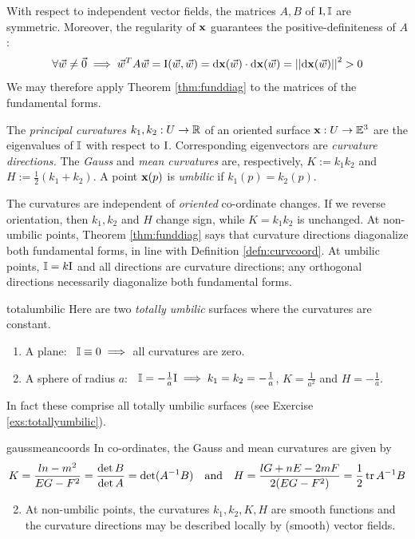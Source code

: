 {}

With respect to independent vector fields, the matrices $A,B$ of $\mathrm{I},\mathbb{I}$ are symmetric. Moreover, the regularity of ${\mathbf{x}}$ guarantees the positive-definiteness of $A$:
\[
	\forall \vec w\neq\vec 0\implies \vec w^TA\vec w=\mathrm{I}(\vec w,\vec w)=\mathrm{d}{\mathbf{x}}(\vec w)\cdot\mathrm{d}{\mathbf{x}}(\vec w)=\left| \left| \mathrm{d}{\mathbf{x}}(\vec w)\right|\right|^2>0
\]
We may therefore apply Theorem \ref{thm:funddiag} to the matrices of the fundamental forms.

\begin{defn}{}{}
	The \emph{principal curvatures} $k_1,k_2:U\to\mathbb{R}$ of an oriented surface ${\mathbf{x}}:U\to\mathbb{E}^3$ are the eigenvalues of $\mathbb{I}$ with respect to $\mathrm{I}$. Corresponding eigenvectors	are \emph{curvature directions.}
	\smallbreak
	The \emph{Gauss} and \emph{mean curvatures} are, respectively, $K:=k_1k_2$ and $H:=\frac 12(k_1+k_2)$.
	\smallbreak
	A point ${\mathbf{x}}(p)$ is \emph{umbilic} if $k_1(p)=k_2(p)$.
\end{defn}


The curvatures are independent of \emph{oriented} co-ordinate changes. If we reverse orientation, then $k_1,k_2$ and $H$ change sign, while $K=k_1k_2$ is unchanged.\smallbreak
At non-umbilic points, Theorem \ref{thm:funddiag} says that curvature directions diagonalize both fundamental forms, in line with Definition \ref{defn:curvcoord}.\smallbreak
At umbilic points, $\mathbb{I}=k\mathrm{I}$ and all directions are curvature directions; any orthogonal directions necessarily diagonalize both fundamental forms. 



\begin{example}{}{totalumbilic}
	Here are two \emph{totally umbilic} surfaces where the curvatures are constant.
	\begin{enumerate}\itemsep2pt
  	\item A plane: \ $\mathbb{I}\equiv 0\implies$ all curvatures are zero.
  	\item A sphere of radius $a$: \ $\mathbb{I}=-\frac 1a\mathrm{I}\implies k_1=k_2= -\frac 1a$, $K=\frac 1{a^2}$ and $H=-\frac 1{a}$.
	\end{enumerate}
	In fact these comprise all totally umbilic surfaces (see Exercise \ref{exs:totallyumbilic}).
\end{example}


\begin{thm}{}{gaussmeancoords}
	\exstart In co-ordinates, the Gauss and mean curvatures are given by
		\[
			K=\frac{ln-m^2}{EG-F^2} =\frac{\det B}{\det A} =\det(A^{-1}B)\quad\text{and} \quad H=\frac{lG+nE-2mF}{2(EG-F^2)}  =\frac 12\operatorname{tr} A^{-1}B
		\]
	\begin{enumerate}\setcounter{enumi}{1}
	  \item At non-umbilic points, the curvatures $k_1,k_2,K,H$ are smooth functions and the curvature directions may be described locally by (smooth) vector fields.
	\end{enumerate}
\end{thm}

